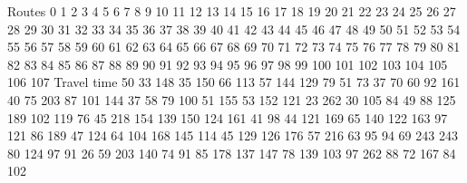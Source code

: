 Routes	0	1	2	3	4	5	6	7	8	9	10	11	12	13	14	15	16	17	18	19	20	21	22	23	24	25	26	27	28	29	30	31	32	33	34	35	36	37	38	39	40	41	42	43	44	45	46	47	48	49	50	51	52	53	54	55	56	57	58	59	60	61	62	63	64	65	66	67	68	69	70	71	72	73	74	75	76	77	78	79	80	81	82	83	84	85	86	87	88	89	90	91	92	93	94	95	96	97	98	99	100	101	102	103	104	105	106	107	
Travel time	50	33	148	35	150	66	113	57	144	129	79	51	73	37	70	60	92	161	40	75	203	87	101	144	37	58	79	100	51	155	53	152	121	23	262	30	105	84	49	88	125	189	102	119	76	45	218	154	139	150	124	161	41	98	44	121	169	65	140	122	163	97	121	86	189	47	124	64	104	168	145	114	45	129	126	176	57	216	63	95	94	69	243	243	80	124	97	91	26	59	203	140	74	91	85	178	137	147	78	139	103	97	262	88	72	167	84	102	
